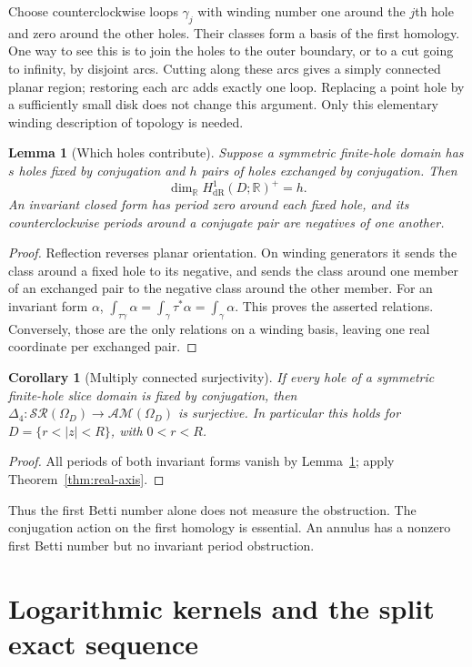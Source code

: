 \documentclass[11pt,a4paper]{article}
\numberwithin{equation}{section}
\newtheorem{lemma}[theorem]{Lemma}
\newtheorem{corollary}[theorem]{Corollary}
\theoremstyle{definition}
\theoremstyle{remark}
\newcommand{\R}{\mathbb R}
\newcommand{\SR}{\mathcal{SR}}
\newcommand{\AM}{\mathcal{AM}}
\newcommand{\lap}{\Delta_4}
\begin{document}
Choose counterclockwise loops $\gamma_j$ with winding number one around the
$j$th hole and zero around the other holes. Their classes form a basis of the
first homology. One way to see this is to join the holes to the outer boundary,
or to a cut going to infinity, by disjoint arcs. Cutting along these arcs gives
a simply connected planar region; restoring each arc adds exactly one loop.
Replacing a point hole by a sufficiently small disk does not change this
argument. Only this elementary winding description of topology is needed.

\begin{lemma}[Which holes contribute]\label{lem:holes}
Suppose a symmetric finite-hole domain has $s$ holes fixed by conjugation and
$h$ pairs of holes exchanged by conjugation. Then
\[
 \dim_{\R}H^1_{\mathrm{dR}}(D;\R)^+=h.
\]
An invariant closed form has period zero around each fixed hole, and its
counterclockwise periods around a conjugate pair are negatives of one another.
\end{lemma}
\begin{proof}
Reflection reverses planar orientation. On winding generators it sends the
class around a fixed hole to its negative, and sends the class around one
member of an exchanged pair to the negative class around the other member.
For an invariant form $\alpha$,
$\int_{\tau\gamma}\alpha=\int_\gamma\tau^*\alpha=\int_\gamma\alpha$.
This proves the asserted relations. Conversely, those are the only relations
on a winding basis, leaving one real coordinate per exchanged pair.
\end{proof}

\begin{corollary}[Multiply connected surjectivity]\label{cor:annulus}
If every hole of a symmetric finite-hole slice domain is fixed by conjugation,
then $\lap:\SR(\Omega_D)\to\AM(\Omega_D)$ is surjective. In particular this
holds for $D=\{r<|z|<R\}$, with $0<r<R$.
\end{corollary}
\begin{proof}
All periods of both invariant forms vanish by Lemma~\ref{lem:holes}; apply
Theorem~\ref{thm:real-axis}.
\end{proof}

Thus the first Betti number alone does not measure the obstruction. The
conjugation action on the first homology is essential. An annulus has a
nonzero first Betti number but no invariant period obstruction.

\section{Logarithmic kernels and the split exact sequence}
\label{sec:kernels}
\end{document}
